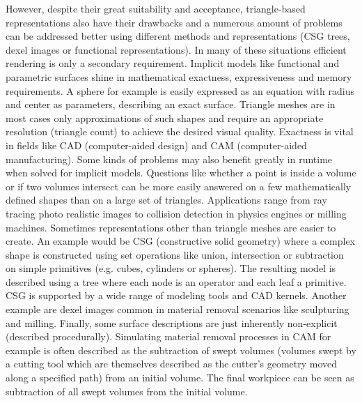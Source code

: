 However, despite their great suitability and acceptance, triangle-based representations also have their drawbacks and a numerous amount of problems can be addressed better using different methods and representations (\eg CSG trees, dexel images or functional representations).
In many of these situations efficient rendering is only a secondary requirement.
Implicit models like functional and parametric surfaces shine in mathematical exactness, expressiveness and memory requirements.
A sphere for example is easily expressed as an equation with radius and center as parameters, describing an exact surface.
Triangle meshes are in most cases only approximations of such shapes and require an appropriate resolution (\ie triangle count) to achieve the desired visual quality.
Exactness is vital in fields like CAD (computer-aided design) and CAM (computer-aided manufacturing).
%
Some kinds of problems may also benefit greatly in runtime when solved for implicit models.
Questions like whether a point is inside a volume or if two volumes intersect can be more easily answered on a few mathematically defined shapes than on a large set of triangles.
Applications range from ray tracing photo realistic images to collision detection in physics engines or milling machines.
%
Sometimes representations other than triangle meshes are easier to create.
An example would be CSG (constructive solid geometry) where a complex shape is constructed using set operations like union, intersection or subtraction on simple primitives (e.g. cubes, cylinders or spheres).
The resulting model is described using a tree where each node is an operator and each leaf a primitive.
CSG is supported by a wide range of modeling tools and CAD kernels.
Another example are dexel images common in material removal scenarios like sculpturing and milling.
%
Finally, some surface descriptions are just inherently non-explicit (\eg described procedurally).
Simulating material removal processes in CAM for example is often described as the subtraction of swept volumes (volumes swept by a cutting tool which are themselves described as the cutter's geometry moved along a specified path) from an initial volume.
The final workpiece can be seen as subtraction of all swept volumes from the initial volume.


